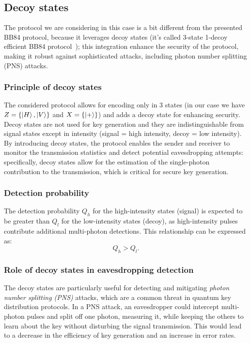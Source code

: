\documentclass[prl,twocolumn]{revtex4-1}
\begin{document}
\subsection{Decoy states}
\label{sec:decoy}
The protocol we are considering in this case is a bit different from the presented BB84 protocol, because it leverages decoy states (it's called 3-state 1-decoy efficient BB84 protocol~\cite{pap2}); this integration enhance the security of the protocol, making it robust against sophisticated attacks, including photon number splitting (PNS) attacks.

\subsubsection{Principle of decoy states}
The considered protocol allows for encoding only in 3 states (in our case we have $Z = \{ \ket H, \ket V\}$ and $X = \{ \ket+\}$) and adds a decoy state for enhancing security. Decoy states are not used for key generation and they are indistinguishable from signal states except in intensity (signal = high intensity, decoy = low intensity). By introducing decoy states, the protocol enables the sender and receiver to monitor the transmission statistics and detect potential eavesdropping attempts: specifically, decoy states allow for the estimation of the single-photon contribution to the transmission, which is critical for secure key generation.

\subsubsection{Detection probability}
The detection probability $Q_h$ for the high-intensity states (signal) is expected to be greater than $Q_l$ for the low-intensity states (decoy), as high-intensity pulses contribute additional multi-photon detections. This relationship can be expressed as:
$$
Q_h > Q_l.
$$

\subsubsection{Role of decoy states in eavesdropping detection}

The decoy states are particularly useful for detecting and mitigating \textit{photon number splitting (PNS)} attacks, which are a common threat in quantum key distribution protocols. In a PNS attack, an eavesdropper could intercept multi-photon pulses and split off one photon, measuring it, while keeping the others to learn about the key without disturbing the signal transmission. This would lead to a decrease in the efficiency of key generation and an increase in error rates.
\end{document}
